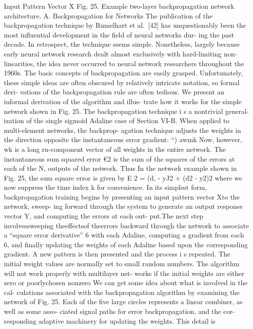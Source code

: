Input Pattern Vector X Fig. 25. Example two-layer backpropagation
network architecture. A. Backpropagation for Networks The publication of
the backpropagation technique by Rumelhart et al.~{[}42{]} has
unquestionably been the most influential development in the field of
neural networks dur- ing the past decade. In retrospect, the technique
seems simple. Nonetheless, largely because early neural network research
dealt almost exclusively with hard-limiting non- linearities, the idea
never occurred to neural network researchers throughout the 1960s. The
basic concepts of backpropagation are easily grasped. Unfortunately,
these simple ideas are often obscured by relatively intricate notation,
so formal deri- vations of the backpropagation rule are often tedious.
We present an informal derivation of the algorithm and illus- trate how
it works for the simple network shown in Fig. 25. The backpropagation
technique i s a nontrivial general- ization of the single sigmoid
Adaline case of Section VI-B. When applied to multi-element networks,
the backprop- agation technique adjusts the weights in the direction
opposite the instantaneous error gradient: ``) awmk Now, however, wk is
a long rn-component vector of all weights in the entire network. The
instantaneous sum squared error €2 is the sum of the squares of the
errors at each of the N, outputs of the network. Thus In the network
example shown in Fig. 25, the sum square error is given by E 2 = (d, -
yJ2 + (d2 - y2)2 where we now suppress the time index k for convenience.
In its simplest form, backpropagation training begins by presenting an
input pattern vector Xto the network, sweep- ing forward through the
system to generate an output response vector Y, and computing the errors
at each out- put.The next step involvessweeping theeffectsof theerrors
backward through the network to associate a ``square error derivative''
6 with each Adaline, computing a gradient from each 6, and finally
updating the weights of each Adaline based upon the corresponding
gradient. A new pattern is then presented and the process i s repeated.
The initial weight values are normally set to small random numbers. The
algorithm will not work properly with multilayer net- works if the
initial weights are either zero or poorlychosen nonzero We can get some
idea about what is involved in the cal- culations associated with the
backpropagation algorithm by examining the network of Fig. 25. Each of
the five large circles represents a linear combiner, as well as some
asso- ciated signal paths for error backpropagation, and the cor-
responding adaptive machinery for updating the weights. This detail is
